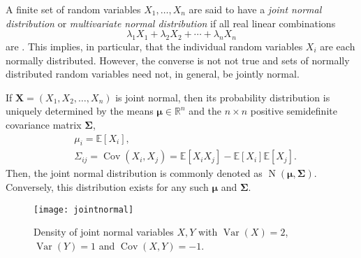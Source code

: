 \documentclass[12pt]{article}
\newcommand{\bs}[1]{\boldsymbol{#1}}
\begin{document}
A finite set of random variables $X_1,\ldots,X_n$ are said to have a
\emph{joint normal distribution} or \emph{multivariate normal
distribution} if all real linear combinations
\begin{equation*}
\lambda_1X_1 + \lambda_2X_2 +\cdots+\lambda_nX_n
\end{equation*}
are . This implies, in particular, that the individual random variables $X_i$ are each normally distributed. However, the converse is not not true and sets of normally distributed random variables need not, in general, be jointly normal.

If $\bs{X}=(X_1,X_2,\ldots,X_n)$ is joint normal, then its probability distribution is uniquely determined by the means $\bs{\mu}\in\mathbb{R}^n$ and the $n\times n$ positive semidefinite covariance matrix $\bs{\Sigma}$,
\begin{align*}
&\mu_i=\mathbb{E}[X_i],\\
&\Sigma_{ij}=\operatorname{Cov}(X_i,X_j)=\mathbb{E}[X_iX_j]-\mathbb{E}[X_i]\mathbb{E}[X_j].
\end{align*}
Then, the joint normal distribution is commonly denoted as $\operatorname{N}(\bs{\mu},\bs{\Sigma})$. Conversely, this distribution exists for any such $\bs{\mu}$ and $\bs{\Sigma}$.

\begin{figure}[H]
\centering
\texttt{[image: jointnormal]}
\caption{Density of joint normal variables $X,Y$ with $\operatorname{Var}(X)=2$, $\operatorname{Var}(Y)=1$ and $\operatorname{Cov}(X,Y)=-1$.}
\end{figure}
\end{document}

